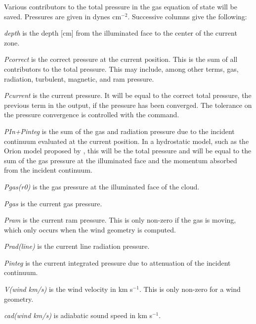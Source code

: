 Various contributors to the total pressure in the gas equation of state
will be saved.  Pressures are given in dynes cm$^{-2}$.
Successive columns give the following:
\begin{description}
\item \emph{depth} is the depth [cm] from the illuminated face to the center of the
current zone.

\item \emph{Pcorrect} is the correct pressure at the current position.  This is the
sum of all contributors to the total pressure.  This may include, among
other terms, gas, radiation, turbulent, magnetic, and ram pressure.

\item \emph{Pcurrent} is the current pressure.  It will be equal to the correct total
pressure, the previous term in the output, if the pressure has been
converged.  The tolerance on the pressure convergence is controlled with
the  command.

\item  \emph{PIn+Pinteg} is the sum of the gas and radiation pressure due to the
incident continuum evaluated at the current position.  In a hydrostatic
model, such as the Orion model proposed by \citet{Baldwin1991}, this will
be the total pressure and will be equal to the sum of the gas pressure at
the illuminated face and the momentum absorbed from the incident continuum.

\item \emph{Pgas(r0)} is the gas pressure at the illuminated face of the cloud.

\item \emph{Pgas} is the current gas pressure.

\item \emph{Pram} is the current ram pressure.  This is only non-zero if the gas is
moving, which only occurs when the wind geometry is computed.

\item \emph{Prad(line)} is the current line radiation pressure.

\item \emph{Pinteg} is the current integrated pressure due to attenuation of the
incident continuum.

\item \emph{V(wind km/s)} is the wind velocity in km s$^{-1}$.  This is only non-zero for
a wind geometry.

\item  \emph{cad(wind km/s)} is adiabatic sound speed in km s$^{-1}$.


\end{description}
